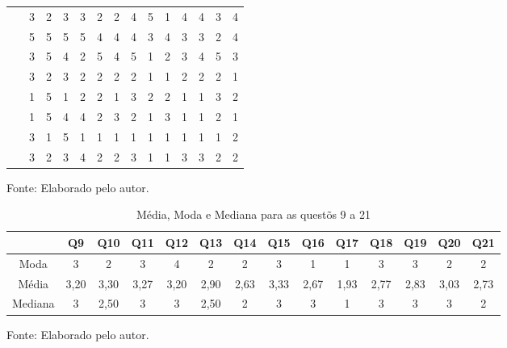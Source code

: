 \documentclass[twoside,english,brazilian]{UNISINOSartigo}
\newcommand{\source}[1]{\caption*{Fonte: {#1}} }
\begin{document}
\begin{table}[h]
\begin{tabularx}{\columnwidth}{cccccccccccccc}
~ & 3 & 2 & 3 & 3 & 2 & 2 & 4 & 5 & 1 & 4 & 4 & 3 & 4 \\
~ & 5 & 5 & 5 & 5 & 4 & 4 & 4 & 3 & 4 & 3 & 3 & 2 & 4 \\
~ & 3 & 5 & 4 & 2 & 5 & 4 & 5 & 1 & 2 & 3 & 4 & 5 & 3 \\
~ & 3 & 2 & 3 & 2 & 2 & 2 & 2 & 1 & 1 & 2 & 2 & 2 & 1 \\
~ & 1 & 5 & 1 & 2 & 2 & 1 & 3 & 2 & 2 & 1 & 1 & 3 & 2 \\
~ & 1 & 5 & 4 & 4 & 2 & 3 & 2 & 1 & 3 & 1 & 1 & 2 & 1 \\
~ & 3 & 1 & 5 & 1 & 1 & 1 & 1 & 1 & 1 & 1 & 1 & 1 & 2 \\
~ & 3 & 2 & 3 & 4 & 2 & 2 & 3 & 1 & 1 & 3 & 3 & 2 & 2 \\ \hline
    \end{tabularx}
    \source{Elaborado pelo autor.}
\end{table}


\begin{table}[h]
\footnotesize
    \caption{Média, Moda e Mediana para as questõs 9 a 21}
    \begin{tabularx}{\columnwidth}{cccccccccccccc}
    \hline
    ~       & Q9   & Q10  & Q11  & Q12  & Q13  & Q14  & Q15  & Q16  & Q17  & Q18  & Q19  & Q20  & Q21  \\\hline
    Moda     & 3    & 2    & 3    & 4    & 2    & 2    & 3    & 1    & 1    & 3    & 3    & 2    & 2    \\
    Média   & 3,20 & 3,30 & 3,27 & 3,20 & 2,90 & 2,63 & 3,33 & 2,67 & 1,93 & 2,77 & 2,83 & 3,03 & 2,73 \\
    Mediana & 3    & 2,50 & 3    & 3    & 2,50 & 2    & 3    & 3    & 1    & 3    & 3    & 3    & 2    \\ \hline
    \end{tabularx}
    \source{Elaborado pelo autor.}
\end{table}
\end{document}
